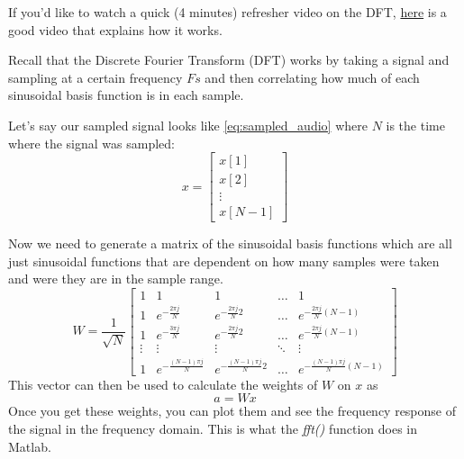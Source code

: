 \documentclass{tufte-handout}
\begin{document}
If you'd like to watch a quick (4 minutes) refresher video on the DFT, \href{https://www.youtube.com/watch?v=h6QJLx22zrE}{here} is a good video that explains how it works.

Recall that the Discrete Fourier Transform (DFT) works by taking a signal and sampling at a certain frequency $Fs$ and then correlating how much of each sinusoidal basis function is in each sample. 

Let's say our sampled signal looks like \ref{eq:sampled_audio} where $N$ is the time where the signal was sampled:
\begin{equation}\label{eq:sampled_audio}
    x=
\begin{bmatrix}
    x[1]       \\
    x[2]       \\
    \vdots \\
    x[N-1]
\end{bmatrix}
\end{equation}

Now we need to generate a matrix of the sinusoidal basis functions which are all just sinusoidal functions that are dependent on how many samples were taken and were they are in the sample range.
\begin{equation}\label{eq:basis_fns}
    W=\dfrac{1}{\sqrt{N}}
\begin{bmatrix}
    1 & 1 & 1 & \dots  & 1 \\
    1 & e^{-\frac{2 \pi j}{N}} & e^{-\frac{2 \pi j}{N}2} & \dots  & e^{-\frac{2 \pi j}{N}(N-1)} \\
    1 & e^{-\frac{3 \pi j}{N}} & e^{-\frac{2 \pi j}{N}2} & \dots  & e^{-\frac{2 \pi j}{N}(N-1)} \\
    \vdots & \vdots & \vdots & \ddots & \vdots \\
    1 & e^{-\frac{(N-1) \pi j}{N}} & e^{-\frac{(N-1) \pi j}{N}2} & \dots  & e^{-\frac{(N-1) \pi j}{N}(N-1)}
\end{bmatrix}
\end{equation}
This vector can then be used to calculate the weights of $W$ on $x$ as
\begin{equation}
a = W x
\end{equation}
Once you get these weights, you can plot them and see the frequency response of the signal in the frequency domain. This is what the \textit{fft()} function does in Matlab.
\end{document}
